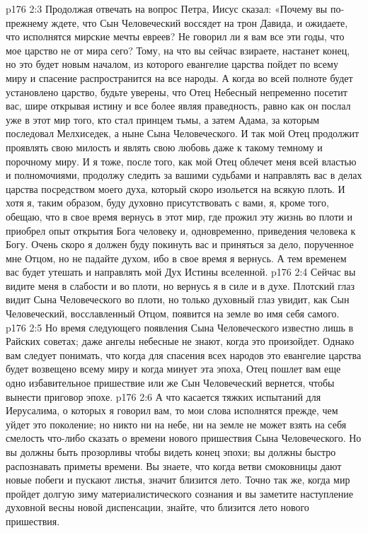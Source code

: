 \vs p176 2:3 \pc Продолжая отвечать на вопрос Петра, Иисус сказал: «Почему вы по\hyp{}прежнему ждете, что Сын Человеческий воссядет на трон Давида, и ожидаете, что исполнятся мирские мечты евреев? Не говорил ли я вам все эти годы, что мое царство не от мира сего? Тому, на что вы сейчас взираете, настанет конец, но это будет новым началом, из которого евангелие царства пойдет по всему миру и спасение распространится на все народы. А когда во всей полноте будет установлено царство, будьте уверены, что Отец Небесный непременно посетит вас, шире открывая истину и все более являя праведность, равно как он послал уже в этот мир того, кто стал принцем тьмы, а затем Адама, за которым последовал Мелхиседек, а ныне Сына Человеческого. И так мой Отец продолжит проявлять свою милость и являть свою любовь даже к такому темному и порочному миру. И я тоже, после того, как мой Отец облечет меня всей властью и полномочиями, продолжу следить за вашими судьбами и направлять вас в делах царства посредством моего духа, который скоро изольется на всякую плоть. И хотя я, таким образом, буду духовно присутствовать с вами, я, кроме того, обещаю, что в свое время вернусь в этот мир, где прожил эту жизнь во плоти и приобрел опыт открытия Бога человеку и, одновременно, приведения человека к Богу. Очень скоро я должен буду покинуть вас и приняться за дело, порученное мне Отцом, но не падайте духом, ибо в свое время я вернусь. А тем временем вас будет утешать и направлять мой Дух Истины вселенной.
\vs p176 2:4 Сейчас вы видите меня в слабости и во плоти, но вернусь я в силе и в духе. Плотский глаз видит Сына Человеческого во плоти, но только духовный глаз увидит, как Сын Человеческий, восславленный Отцом, появится на земле во имя себя самого.
\vs p176 2:5 Но время следующего появления Сына Человеческого известно лишь в Райских советах; даже ангелы небесные не знают, когда это произойдет. Однако вам следует понимать, что когда для спасения всех народов это евангелие царства будет возвещено всему миру и когда минует эта эпоха, Отец пошлет вам еще одно избавительное пришествие или же Сын Человеческий вернется, чтобы вынести приговор эпохе.
\vs p176 2:6 А что касается тяжких испытаний для Иерусалима, о которых я говорил вам, то мои слова исполнятся прежде, чем уйдет это поколение; но никто ни на небе, ни на земле не может взять на себя смелость что\hyp{}либо сказать о времени нового пришествия Сына Человеческого. Но вы должны быть прозорливы чтобы видеть конец эпохи; вы должны быстро распознавать приметы времени. Вы знаете, что когда ветви смоковницы дают новые побеги и пускают листья, значит близится лето. Точно так же, когда мир пройдет долгую зиму материалистического сознания и вы заметите наступление духовной весны новой диспенсации, знайте, что близится лето нового пришествия.

